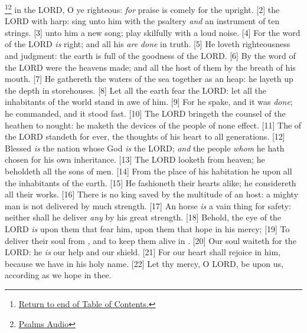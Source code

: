 \footnote{\textcolor[cmyk]{0.99998,1,0,0}{\hyperlink{TOC}{Return to end of Table of Contents.}}}\footnote{\href{https://audiobible.com/bible/}{\textcolor[cmyk]{0.99998,1,0,0}{Psalms Audio}}}\textcolor[cmyk]{0.99998,1,0,0}{ in the LORD, O ye righteous: \emph{for} praise is comely for the upright.}
[2] \textcolor[cmyk]{0.99998,1,0,0}{ the LORD with harp: sing unto him with the psaltery \emph{and} an instrument of ten strings.}
[3] \textcolor[cmyk]{0.99998,1,0,0}{ unto him a new song; play skilfully with a loud noise.}
[4] \textcolor[cmyk]{0.99998,1,0,0}{For the word of the LORD \emph{is} right; and all his  \emph{are} \emph{done} in truth.}
[5] \textcolor[cmyk]{0.99998,1,0,0}{He loveth righteousness and judgment: the earth is full of the goodness of the LORD.}
[6] \textcolor[cmyk]{0.99998,1,0,0}{By the word of the LORD were the heavens made; and all the host of them by the breath of his mouth.}
[7] \textcolor[cmyk]{0.99998,1,0,0}{He gathereth the waters of the sea together as an heap: he layeth up the depth in storehouses.}
[8] \textcolor[cmyk]{0.99998,1,0,0}{Let all the earth fear the LORD: let all the inhabitants of the world stand in awe of him.}
[9] \textcolor[cmyk]{0.99998,1,0,0}{For he spake, and it was \emph{done}; he commanded, and it stood fast.}
[10] \textcolor[cmyk]{0.99998,1,0,0}{The LORD bringeth the counsel of the heathen to nought: he maketh the devices of the people of none effect.}
[11] \textcolor[cmyk]{0.99998,1,0,0}{The  of the LORD standeth for ever, the thoughts of his heart to all generations.}
[12] \textcolor[cmyk]{0.99998,1,0,0}{Blessed \emph{is} the nation whose God \emph{is} the LORD; \emph{and} the people \emph{whom} he hath chosen for his own inheritance.}
[13] \textcolor[cmyk]{0.99998,1,0,0}{The LORD looketh from heaven; he beholdeth all the sons of men.}
[14] \textcolor[cmyk]{0.99998,1,0,0}{From the place of his habitation he  upon all the inhabitants of the earth.}
[15] \textcolor[cmyk]{0.99998,1,0,0}{He fashioneth their hearts alike; he considereth all their works.}
[16] \textcolor[cmyk]{0.99998,1,0,0}{There is no king saved by the multitude of an host: a mighty man is not delivered by much strength.}
[17] \textcolor[cmyk]{0.99998,1,0,0}{An horse \emph{is} a vain thing for safety: neither shall he deliver \emph{any} by his great strength.}
[18] \textcolor[cmyk]{0.99998,1,0,0}{Behold, the eye of the LORD \emph{is} upon them that fear him, upon them that hope in his mercy;}
[19] \textcolor[cmyk]{0.99998,1,0,0}{To deliver their soul from , and to keep them alive in .}
[20] \textcolor[cmyk]{0.99998,1,0,0}{Our soul waiteth for the LORD: he \emph{is} our help and our shield.}
[21] \textcolor[cmyk]{0.99998,1,0,0}{For our heart shall rejoice in him, because we have  in his holy name.}
[22] \textcolor[cmyk]{0.99998,1,0,0}{Let thy mercy, O LORD, be upon us, according as we hope in thee.}